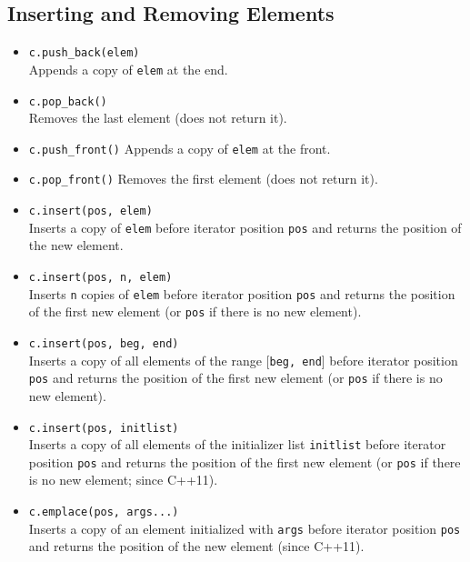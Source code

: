 \documentclass{report}
\begin{document}
\subsection{Inserting and Removing Elements}
\begin{itemize}
    \item \texttt{c.push\_back(elem)} \\
          Appends a copy of \texttt{elem} at the end.
          
    \item \texttt{c.pop\_back()} \\
          Removes the last element (does not return it).
          
              
  \item \texttt{c.push\_front()}
                Appends a copy of \texttt{elem} at the front.

  \item \texttt{c.pop\_front()}
        Removes the first element (does not return it).

    \item \texttt{c.insert(pos, elem)} \\
          Inserts a copy of \texttt{elem} before iterator position \texttt{pos} and returns the position of the new element.

          
    \item \texttt{c.insert(pos, n, elem)} \\
          Inserts \texttt{n} copies of \texttt{elem} before iterator position \texttt{pos} and returns the position of the first new element (or \texttt{pos} if there is no new element).
          
    \item \texttt{c.insert(pos, beg, end)} \\
          Inserts a copy of all elements of the range [\texttt{beg, end}] before iterator position \texttt{pos} and returns the position of the first new element (or \texttt{pos} if there is no new element).
          
    \item \texttt{c.insert(pos, initlist)} \\
          Inserts a copy of all elements of the initializer list \texttt{initlist} before iterator position \texttt{pos} and returns the position of the first new element (or \texttt{pos} if there is no new element; since C++11).
          
    \item \texttt{c.emplace(pos, args...)} \\
          Inserts a copy of an element initialized with \texttt{args} before iterator position \texttt{pos} and returns the position of the new element (since C++11).
          

\end{itemize}
\end{document}
